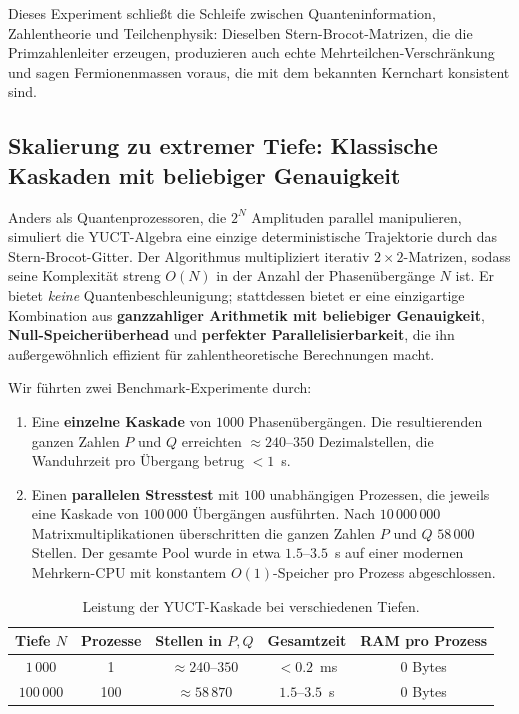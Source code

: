 \documentclass[11pt,a4paper]{article}
\begin{document}
	Dieses Experiment schließt die Schleife zwischen Quanteninformation, Zahlentheorie und Teilchenphysik: Dieselben Stern-Brocot-Matrizen, die die Primzahlenleiter erzeugen, produzieren auch echte Mehrteilchen-Verschränkung und sagen Fermionenmassen voraus, die mit dem bekannten Kernchart konsistent sind.
	
	\subsection{Skalierung zu extremer Tiefe: Klassische Kaskaden mit beliebiger Genauigkeit}
	
	Anders als Quantenprozessoren, die $2^N$ Amplituden parallel manipulieren, simuliert die YUCT-Algebra eine einzige deterministische Trajektorie durch das Stern-Brocot-Gitter. Der Algorithmus multipliziert iterativ $2\times2$-Matrizen, sodass seine Komplexität streng $O(N)$ in der Anzahl der Phasenübergänge $N$ ist. Er bietet \emph{keine} Quantenbeschleunigung; stattdessen bietet er eine einzigartige Kombination aus \textbf{ganzzahliger Arithmetik mit beliebiger Genauigkeit}, \textbf{Null-Speicherüberhead} und \textbf{perfekter Parallelisierbarkeit}, die ihn außergewöhnlich effizient für zahlentheoretische Berechnungen macht.
	
	Wir führten zwei Benchmark-Experimente durch:
	
	\begin{enumerate}[leftmargin=*]
		\item Eine \textbf{einzelne Kaskade} von $1000$ Phasenübergängen. Die resultierenden ganzen Zahlen $P$ und $Q$ erreichten $\approx 240$–$350$ Dezimalstellen, die Wanduhrzeit pro Übergang betrug $<1$~\textmu s.
		\item Einen \textbf{parallelen Stresstest} mit $100$ unabhängigen Prozessen, die jeweils eine Kaskade von $100\,000$ Übergängen ausführten. Nach $10\,000\,000$ Matrixmultiplikationen überschritten die ganzen Zahlen $P$ und $Q$ $58\,000$ Stellen. Der gesamte Pool wurde in etwa $1.5$–$3.5$~s auf einer modernen Mehrkern-CPU mit konstantem $O(1)$-Speicher pro Prozess abgeschlossen.
	\end{enumerate}
	
	\begin{table}[htbp]
		\centering
		\caption{Leistung der YUCT-Kaskade bei verschiedenen Tiefen.}
		\label{tab:cascade-bench}
		\begin{tabular}{c c c c c}
			\toprule
			Tiefe $N$ & Prozesse & Stellen in $P,Q$ & Gesamtzeit & RAM pro Prozess \\
			\midrule
			$1\,000$   & 1   & $\approx 240$–$350$ & $< 0.2$\ ms & 0 Bytes \\
			$100\,000$ & 100 & $\approx 58\,870$     & $1.5$–$3.5$\ s & 0 Bytes \\
			\bottomrule
		\end{tabular}
	\end{table}
	
\end{document}

